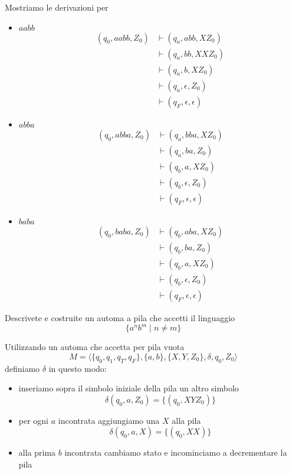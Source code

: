 \documentclass[12pt, answers]{exam}
\begin{document}
\begin{questions}
\begin{solution}
		Mostriamo le derivazioni per 
		\begin{itemize}
			\item $aabb$
				\begin{align*}
					(q_0, aabb, Z_0) &\vdash (q_a, abb, XZ_0) \\
					&\vdash (q_a, bb, XXZ_0) \\
					&\vdash (q_a, b, XZ_0) \\
					&\vdash (q_a, \epsilon, Z_0) \\
					&\vdash (q_F, \epsilon, \epsilon)
				\end{align*}
			\item $abba$
				\begin{align*}
					(q_0, abba, Z_0) &\vdash (q_a, bba, XZ_0) \\
					&\vdash (q_a, ba, Z_0) \\
					&\vdash (q_b, a, XZ_0) \\
					&\vdash (q_b, \epsilon, Z_0) \\
					&\vdash (q_F, \epsilon, \epsilon)
				\end{align*}
			\item $baba$
				\begin{align*}
					(q_0, baba, Z_0) &\vdash (q_b, aba, XZ_0) \\
					&\vdash (q_b, ba, Z_0) \\
					&\vdash (q_b, a, XZ_0) \\
					&\vdash (q_b, \epsilon, Z_0) \\
					&\vdash (q_F, \epsilon, \epsilon)
				\end{align*}
		\end{itemize}
	\end{solution}
	\question Descrivete e costruite un automa a pila che accetti il linguaggio
	$$ \{ a^n b^m \mid n \neq m \} $$
	\begin{solution}
		Utilizzando un automa che accetta per pila vuota
		$$ M = \langle \{q_0, q_1, q_T, q_F\}, \{a, b\}, \{X, Y, Z_0\}, \delta, q_0, Z_0\rangle $$
		definiamo $\delta$ in questo modo:
		\begin{itemize}
			\item inseriamo sopra il simbolo iniziale della pila un altro simbolo
				$$ \delta(q_0, a, Z_0) = \{ (q_0, XYZ_0) \} $$
			\item per ogni $a$ incontrata aggiungiamo una $X$ alla pila
				$$ \delta(q_0, a, X) = \{ (q_0, XX) \} $$
			\item alla prima $b$ incontrata cambiamo stato e incominciamo a decrementare la pila

\end{itemize}
\end{solution}
\end{questions}
\end{document}
